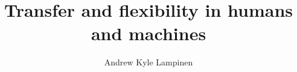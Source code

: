 \documentclass{report}
\begin{document}
\title{Transfer and flexibility in humans and machines}
\author{Andrew Kyle Lampinen}

\beforepreface
{}

\afterpreface







%

\appendix





\end{document}
